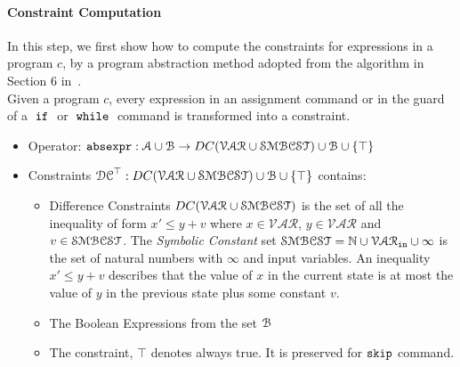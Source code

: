 \paragraph{Constraint Computation}
In this step, we first show how to compute the constraints for expressions in a program $c$,
by a program abstraction method adopted from the
algorithm in Section 6 in~\cite{sinn2017complexity}.
\\
Given a program $c$,
every expression in an assignment command or in the guard of a $\;\mathtt{if}\;$ or $\;\mathtt{while}\;$ command
is transformed into a constraint.

\begin{itemize}
\item Operator: $\mathtt{abs}{\mathtt{expr}} : \mathcal{A} \cup \mathcal{B} \to DC(\mathcal{VAR}  \cup \mathcal{SMBCST})\cup \mathcal{B} \cup \{\top\}$
%
\item Constraints $\mathcal{DC}^{\top}: DC(\mathcal{VAR}  \cup \mathcal{SMBCST}) \cup \mathcal{B}\cup \{\top\}$  contains:
%
\begin{itemize}
\item Difference Constraints $DC(\mathcal{VAR}  \cup \mathcal{SMBCST})$ is the set of all the inequality of
form $x' \leq y + v$ where $x \in \mathcal{VAR} $, 
$y \in \mathcal{VAR}$ and $v \in \mathcal{SMBCST}$.
The \emph{Symbolic Constant} set $\mathcal{SMBCST} = \mathbb{N} \cup \mathcal{VAR}_{\mathtt{in}} \cup{\infty}$
is the set of natural numbers with $\infty$ and input variables.
An inequality $x' \leq y + v$ describes that the value of $x$ in the current state is
at most the value of $y$ in the previous state plus some constant $v$.
%
\item The Boolean Expressions from the set $\mathcal{B}$
%
\item The constraint, $\top$ denotes always true. It is preserved for $\mathtt{skip}$ command.
\end{itemize}
\end{itemize}

